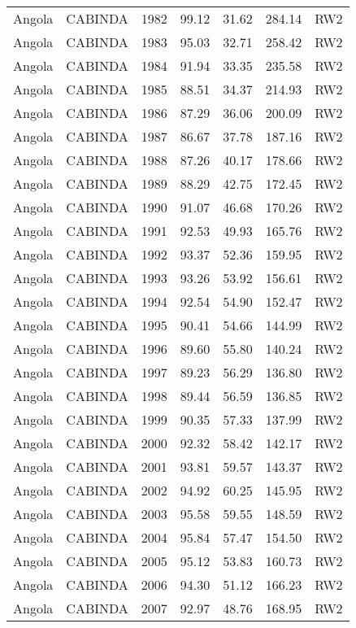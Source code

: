 \begin{longtable}{lllrrrl}
  Angola & CABINDA & 1982 & 99.12 & 31.62 & 284.14 & RW2 \\ 
  Angola & CABINDA & 1983 & 95.03 & 32.71 & 258.42 & RW2 \\ 
  Angola & CABINDA & 1984 & 91.94 & 33.35 & 235.58 & RW2 \\ 
  Angola & CABINDA & 1985 & 88.51 & 34.37 & 214.93 & RW2 \\ 
  Angola & CABINDA & 1986 & 87.29 & 36.06 & 200.09 & RW2 \\ 
  Angola & CABINDA & 1987 & 86.67 & 37.78 & 187.16 & RW2 \\ 
  Angola & CABINDA & 1988 & 87.26 & 40.17 & 178.66 & RW2 \\ 
  Angola & CABINDA & 1989 & 88.29 & 42.75 & 172.45 & RW2 \\ 
  Angola & CABINDA & 1990 & 91.07 & 46.68 & 170.26 & RW2 \\ 
  Angola & CABINDA & 1991 & 92.53 & 49.93 & 165.76 & RW2 \\ 
  Angola & CABINDA & 1992 & 93.37 & 52.36 & 159.95 & RW2 \\ 
  Angola & CABINDA & 1993 & 93.26 & 53.92 & 156.61 & RW2 \\ 
  Angola & CABINDA & 1994 & 92.54 & 54.90 & 152.47 & RW2 \\ 
  Angola & CABINDA & 1995 & 90.41 & 54.66 & 144.99 & RW2 \\ 
  Angola & CABINDA & 1996 & 89.60 & 55.80 & 140.24 & RW2 \\ 
  Angola & CABINDA & 1997 & 89.23 & 56.29 & 136.80 & RW2 \\ 
  Angola & CABINDA & 1998 & 89.44 & 56.59 & 136.85 & RW2 \\ 
  Angola & CABINDA & 1999 & 90.35 & 57.33 & 137.99 & RW2 \\ 
  Angola & CABINDA & 2000 & 92.32 & 58.42 & 142.17 & RW2 \\ 
  Angola & CABINDA & 2001 & 93.81 & 59.57 & 143.37 & RW2 \\ 
  Angola & CABINDA & 2002 & 94.92 & 60.25 & 145.95 & RW2 \\ 
  Angola & CABINDA & 2003 & 95.58 & 59.55 & 148.59 & RW2 \\ 
  Angola & CABINDA & 2004 & 95.84 & 57.47 & 154.50 & RW2 \\ 
  Angola & CABINDA & 2005 & 95.12 & 53.83 & 160.73 & RW2 \\ 
  Angola & CABINDA & 2006 & 94.30 & 51.12 & 166.23 & RW2 \\ 
  Angola & CABINDA & 2007 & 92.97 & 48.76 & 168.95 & RW2 \\ 

\end{longtable}
